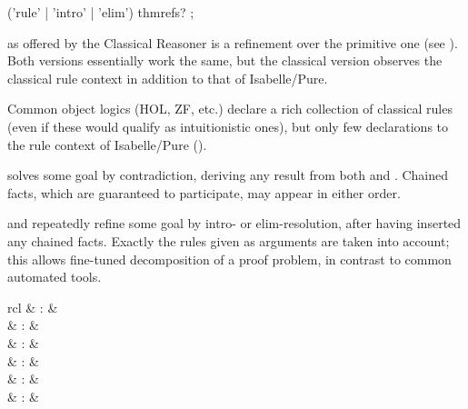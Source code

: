 \begin{isabellebody}
\begin{isamarkuptext}
  \begin{rail}
    ('rule' | 'intro' | 'elim') thmrefs?
    ;
  \end{rail}

  \begin{descr}

  \item [\hyperlink{method.rule}{\mbox{\isa{rule}}}] as offered by the Classical Reasoner is a
  refinement over the primitive one (see ).
  Both versions essentially work the same, but the classical version
  observes the classical rule context in addition to that of
  Isabelle/Pure.

  Common object logics (HOL, ZF, etc.) declare a rich collection of
  classical rules (even if these would qualify as intuitionistic
  ones), but only few declarations to the rule context of
  Isabelle/Pure ().

  \item [\hyperlink{method.contradiction}{\mbox{\isa{contradiction}}}] solves some goal by contradiction,
  deriving any result from both  and .  Chained
  facts, which are guaranteed to participate, may appear in either
  order.

  \item [\hyperlink{method.intro}{\mbox{\isa{intro}}} and \hyperlink{method.elim}{\mbox{\isa{elim}}}] repeatedly refine some
  goal by intro- or elim-resolution, after having inserted any chained
  facts.  Exactly the rules given as arguments are taken into account;
  this allows fine-tuned decomposition of a proof problem, in contrast
  to common automated tools.

  \end{descr}%
\end{isamarkuptext}%
\isamarkuptrue%
%
\isamarkuptrue%
%
\begin{isamarkuptext}%
\begin{matharray}{rcl}
    \hypertarget{method.blast}{\hyperlink{method.blast}{\mbox{}}} & : & \isarmeth \\
    \hypertarget{method.fast}{\hyperlink{method.fast}{\mbox{}}} & : & \isarmeth \\
    \hypertarget{method.slow}{\hyperlink{method.slow}{\mbox{}}} & : & \isarmeth \\
    \hypertarget{method.best}{\hyperlink{method.best}{\mbox{}}} & : & \isarmeth \\
    \hypertarget{method.safe}{\hyperlink{method.safe}{\mbox{}}} & : & \isarmeth \\
    \hypertarget{method.clarify}{\hyperlink{method.clarify}{\mbox{}}} & : & \isarmeth \\
  \end{matharray}


\end{isamarkuptext}
\end{isabellebody}
